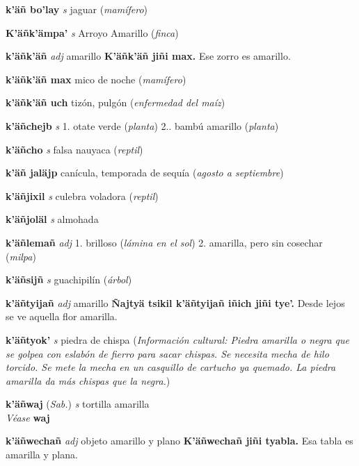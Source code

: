 \documentclass[10pt]{scrbook}
\newcommand{\entry}[1]{\textbf{#1}}
\newcommand{\onedefinition}[1]{#1.}
\newcommand{\partofspeech}[1]{\textit{#1}}
\newcommand{\spanishtranslation}[1]{#1}
\newcommand{\clarification}[1]{(\textit{#1})}
\newcommand{\cholexample}[1]{\textbf{#1}}
\newcommand{\exampletranslation}[1]{#1}
\newcommand{\alsosee}[1]{\\\textit{Véase} \textbf{#1}}
\newcommand{\relevantdialect}[1]{(\textit{#1})}
\newcommand{\culturalinformation}[1]{(\textit{#1})}
\begin{document}
\begin{multicols}{2}
\entry{k'äñ bo'lay}
\partofspeech{s}
\spanishtranslation{jaguar}
\clarification{mamífero}

\entry{K'äñk'ämpa'}
\partofspeech{s}
\spanishtranslation{Arroyo Amarillo}
\clarification{finca}

\entry{k'äñk'äñ}
\partofspeech{adj}
\spanishtranslation{amarillo}
\cholexample{K'äñk'äñ jiñi max.}
\exampletranslation{Ese zorro es amarillo.}

\entry{k'äñk'äñ max}
\spanishtranslation{mico de noche}
\clarification{mamífero}

\entry{k'äñk'äñ uch}
\spanishtranslation{tizón, pulgón}
\clarification{enfermedad del maíz}

\entry{k'äñchejb}
\partofspeech{s}
\onedefinition{1}
\spanishtranslation{otate verde}
\clarification{planta}
\onedefinition{2.}
\spanishtranslation{bambú amarillo}
\clarification{planta}

\entry{k'äñcho}
\partofspeech{s}
\spanishtranslation{falsa nauyaca}
\clarification{reptil}

\entry{k'äñ jaläjp}
\spanishtranslation{canícula, temporada de sequía}
\clarification{agosto a septiembre}

\entry{k'äñjixil}
\partofspeech{s}
\spanishtranslation{culebra voladora}
\clarification{reptil}

\entry{k'äñjoläl}
\partofspeech{s}
\spanishtranslation{almohada}

\entry{k'äñlemañ}
\partofspeech{adj}
\onedefinition{1}
\spanishtranslation{brilloso}
\clarification{lámina en el sol}
\onedefinition{2}
\spanishtranslation{amarilla, pero sin cosechar}
\clarification{milpa}

\entry{k'äñsijñ}
\partofspeech{s}
\spanishtranslation{guachipilín}
\clarification{árbol}

\entry{k'äñtyijañ}
\partofspeech{adj}
\spanishtranslation{amarillo}
\cholexample{Ñajtyä tsikil k'äñtyijañ iñich jiñi tye'.}
\exampletranslation{Desde lejos se ve aquella flor amarilla.}

\entry{k'äñtyok'}
\partofspeech{s}
\spanishtranslation{piedra de chispa}
\culturalinformation{Información cultural: Piedra amarilla o negra que se golpea con eslabón de fierro para sacar chispas. Se necesita mecha de hilo torcido. Se mete la mecha en un casquillo de cartucho ya quemado. La piedra amarilla da más chispas que la negra.}

\entry{k'äñwaj}
\relevantdialect{Sab.}
\partofspeech{s}
\spanishtranslation{tortilla amarilla}
\alsosee{waj}

\entry{k'äñwechañ}
\partofspeech{adj}
\spanishtranslation{objeto amarillo y plano}
\cholexample{K'äñwechañ jiñi tyabla.}
\exampletranslation{Esa tabla es amarilla y plana.}


\end{multicols}
\end{document}
